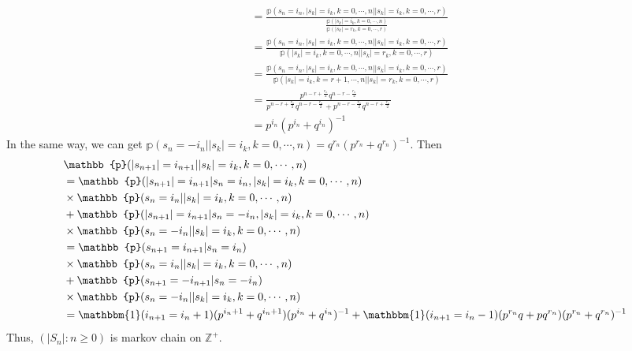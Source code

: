 \documentclass{ctexart}
\begin{document}
\begin{solution}
\begin{enumerate}
\[\begin{aligned}
          \\   & =          \frac{\mathbb{p}(s_{n}=i_n,|s_k|=i_k,k=0,\cdots,n||s_k|=i_k,k=0,\cdots,r)}{\frac{\mathbb{p}(|s_k|=i_k,k=0,\cdots,n)}{\mathbb{p}(|s_k|=r_k,k=0,\cdots,r)}}
          \\   & =          \frac{\mathbb{p}(s_{n}=i_n,|s_k|=i_k,k=0,\cdots,n||s_k|=i_k,k=0,\cdots,r)}{\mathbb{p}(|s_k|=i_k,k=0,\cdots,n||s_k|=r_k,k=0,\cdots,r)}
          \\   & =          \frac{\mathbb{p}(s_{n}=i_n,|s_k|=i_k,k=0,\cdots,n||s_k|=i_k,k=0,\cdots,r)}{\mathbb{p}(|s_k|=i_k,k=r + 1,\cdots,n||s_k|=r_k,k=0,\cdots,r)}
          \\   & =\frac{p^{n - r + \frac{r_n}{2}}q^{n-r - \frac{r_n}{2}}}{p^{n - r + \frac{r_n}{2}}q^{n-r - \frac{r_n}{2}}+p^{n - r - \frac{r_n}{2}}q^{n-r + \frac{r_n}{2}}}
          \\&=p^{i_n}(p^{i_n}+q^{i_n})^{-1}
        \end{aligned}
      \]
      In the same way, we can get \(\mathbb{p}(s_{n}=-i_n| |s_k|=i_k,k=0,\cdots,n)=q^{r_n}(p^{r_n}+q^{r_n})^{-1}\).
      Then
      \[
        \begin{aligned}
           & \mathbb{p}(|s_{n + 1}|=i_{n + 1}| |s_k|=i_k,k=0,\cdots,n)
          \\   & =          \mathbb{p}(|s_{n + 1}|=i_{n + 1}|s_n=i_n ,|s_k|=i_k,k=0,\cdots,n)
          \\   & \times          \mathbb{p}(s_n=i_n ||s_k|=i_k,k=0,\cdots,n)
          \\   & +          \mathbb{p}(|s_{n + 1}|=i_{n + 1}|s_n=-i_n ,|s_k|=i_k,k=0,\cdots,n)
          \\   & \times          \mathbb{p}(s_n=-i_n ||s_k|=i_k,k=0,\cdots,n)
          \\   & =          \mathbb{p}(s_{n + 1}=i_{n + 1}|s_n=i_n)
          \\   & \times          \mathbb{p}(s_n=i_n ||s_k|=i_k,k=0,\cdots,n)
          \\   & +          \mathbb{p}(s_{n + 1}=-i_{n + 1}|s_n=-i_n)
          \\   & \times          \mathbb{p}(s_n=-i_n ||s_k|=i_k,k=0,\cdots,n)
          \\ &=\mathbbm{1}(i_{n + 1}=i_n +1)(p^{i_n + 1} +q^{i_n + 1})(p^{i_n} + q^{i_n})^{-1} + \mathbbm{1}(i_{n + 1}=i_n-1)(p^{r_n}q +pq^{r_n })(p^{r_n} + q^{r_n})^{-1}
        \end{aligned}
      \]
      Thus, \((|S_n|:n \geq 0)\) is markov chain on \(\mathbb{Z}^+\).

  \end{enumerate}

\end{solution}
\end{document}
